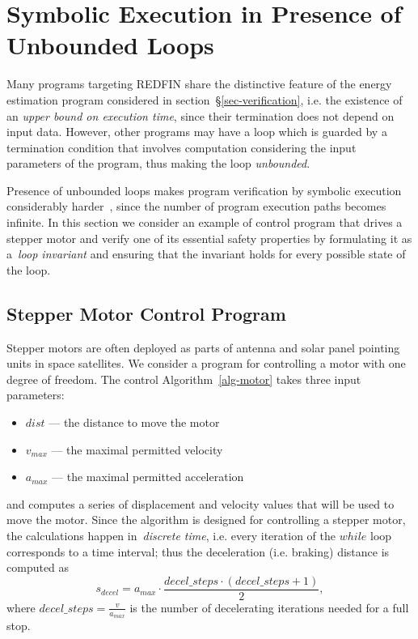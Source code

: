 \section{Symbolic Execution in Presence of Unbounded Loops\label{sec-motor-control}}

Many programs targeting REDFIN share the distinctive feature of
the energy estimation program considered in section~\S\ref{sec-verification},
i.e. the existence of an  \emph{upper bound on execution time},
since their termination does not depend on input data.
However, other programs may have a loop
which is guarded by a termination condition that involves computation
considering the input parameters of the program, thus making the loop
\emph{unbounded}.

Presence of unbounded loops makes program verification by symbolic execution considerably
harder~\cite[p.~50:20]{SurveySymExec-CSUR18}, since the number of program execution
paths becomes infinite. In this section we consider an example
of control program that drives a stepper motor and verify one of its essential
safety properties by formulating it as a~\emph{loop invariant} and ensuring that the
invariant holds for every possible state of the loop.

\subsection{Stepper Motor Control Program}

Stepper motors are often deployed as parts of antenna and solar panel pointing units
in space satellites. We consider a program for controlling a motor with
one degree of freedom. The control Algorithm~\ref{alg-motor} takes three input
parameters:
\begin{itemize}
\item $dist$ --- the distance to move the motor
\item $v_{max}$ --- the maximal permitted velocity
\item $a_{max}$ --- the maximal permitted acceleration
\end{itemize}

\noindent
and computes a series of
displacement and velocity values that will be used to move the motor. Since the algorithm is
designed for controlling a stepper motor, the calculations happen in~\emph{discrete time},
i.e. every iteration of the $while$ loop corresponds to a time interval; thus
the deceleration (i.e. braking) distance is computed as
\[
s_{decel} = a_{max} \cdot \frac{decel\_steps \cdot (decel\_steps + 1)}{2},
\]
where $decel\_steps = \frac{v}{a_{max}}$ is the number of decelerating iterations
needed for a full stop.

